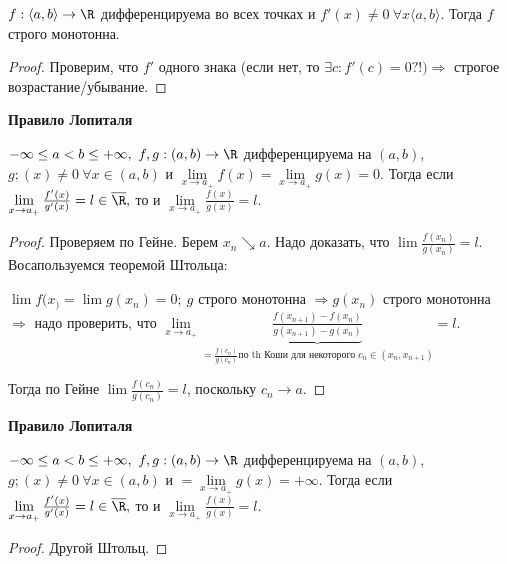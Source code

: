 \begin{corollary}
    $f:\langle a,b\rangle\rightarrow \R$ дифференцируема во всех точках и $f'(x)\neq 0\ \forall x \langle a,b\rangle$. Тогда $f$ строго монотонна.
\end{corollary}

\begin{proof}
    Проверим, что $f'$ одного знака (если нет, то $\exists c: f'(c)=0 ?!)\Rightarrow $ строгое возрастание/убывание.
\end{proof}

\begin{theorem}
    \textbf{Правило Лопиталя}

    $-\infty \leq a< b\leq +\infty,\ f,g:(a,b)\rightarrow\R$ дифференцируема на $(a,b)$, $g;(x)\neq 0\ \forall x\in(a,b)$ и $\lim\limits_{x\rightarrow a_+}f(x)=\lim\limits_{x\rightarrow a_+}g(x)=0$. Тогда если $\lim\limits_{x\rightarrow a_+}\frac{f'(x)}{g'(x)}=l\in \overline{\R},$ то и $\lim\limits_{x\rightarrow a_+}\frac{f(x)}{g(x)}=l$.
\end{theorem}

\begin{proof}
    Проверяем по Гейне. Берем $x_n\searrow a$. Надо доказать, что $\lim\frac{f(x_n)}{g(x_n)}=l$. Восапользуемся теоремой Штольца:

    $\lim f(x_)=\lim g(x_n)=0;\ g$ строго монотонна $\Rightarrow g(x_n)$ строго монотонна $\Rightarrow$ надо проверить, что $\lim\limits_{x\rightarrow a_+}\underbrace{\frac{f(x_{n+1})-f(x_n)}{g(x_{n+1})-g(x_n)}}_{=\frac{f(c_n)}{g(c_n)}\text{по th Коши для некоторого } c_n\in(x_n,x_{n+1})}=l$.

    Тогда по Гейне $\lim \frac{f(c_n)}{g(c_n)}=l$, поскольку $c_n\rightarrow a$.
\end{proof}

\begin{theorem}
    \textbf{Правило Лопиталя}

    $-\infty \leq a< b\leq +\infty,\ f,g:(a,b)\rightarrow\R$ дифференцируема на $(a,b)$, $g;(x)\neq 0\ \forall x\in(a,b)$ и $=\lim\limits_{x\rightarrow a_+}g(x)=+\infty$. Тогда если $\lim\limits_{x\rightarrow a_+}\frac{f'(x)}{g'(x)}=l\in \overline{\R},$ то и $\lim\limits_{x\rightarrow a_+}\frac{f(x)}{g(x)}=l$.
\end{theorem}

\begin{proof}
    Другой Штольц.
\end{proof}


